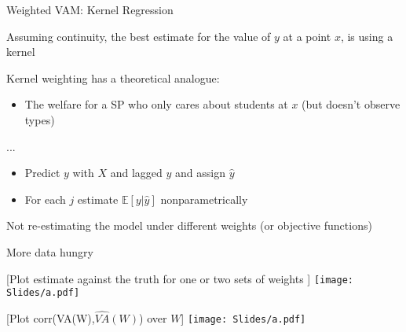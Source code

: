 \documentclass[t,aspectratio=169,11pt]{beamer}
\newenvironment{wideitemize}{\itemize\addtolength{\itemsep}{14pt}}{\enditemize}
\begin{document}
\begin{frame}{Weighted VAM: Kernel Regression}

\begin{wideitemize}

    \item Assuming continuity, the best estimate for the value of $y$ at a point $x$,  is using a kernel
    \item Kernel weighting has a theoretical analogue: 
    \begin{itemize}
        \item The welfare for a SP who only cares about students at $x$ (but doesn't observe types)
    \end{itemize}
 
    
    \item ... \citep{}
    \begin{itemize}
        \item Predict $y$ with $X$ and lagged $y$ and assign $\hat{y}$
        \item For each $j$ estimate $\mathbb{E}[y|\hat{y}]$ nonparametrically
    \end{itemize}

    \item Not re-estimating the model under different weights (or objective functions)
    \item More data hungry \color{gray}{(when to talk about heterogeneity vs changes over time?)
    \item Bandwidth selection...? (Also a place to talk about measuring scores in pctle vs $\sigma$?)}

\end{wideitemize}
\end{frame}

\begin{frame}{[Plot estimate against the truth for one or two sets of weights ]} 
\centering
{}
\texttt{[image: Slides/a.pdf]}

\end{frame}

\begin{frame}{[Plot corr(VA(W),$\hat{VA}(W)$) over $W$]} 
\centering
{}
\texttt{[image: Slides/a.pdf]}

\end{frame}
\end{document}
